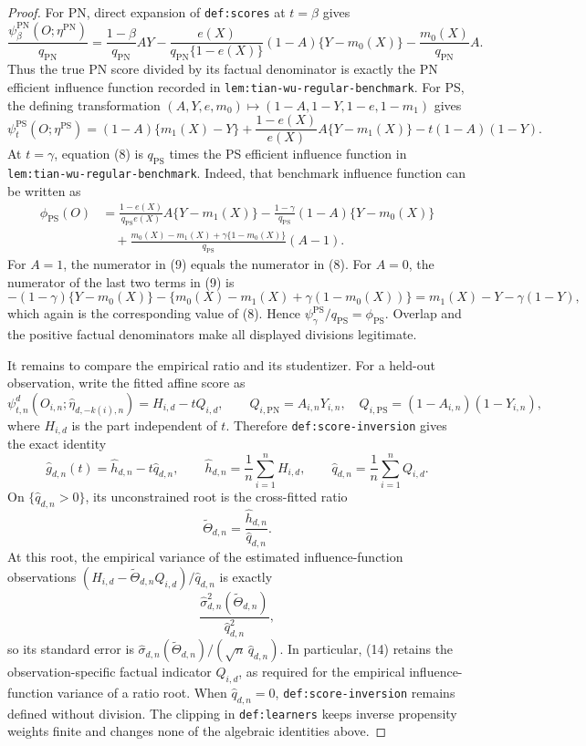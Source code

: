 \documentclass{article}
\begin{document}
\begin{proof}
For PN, direct expansion of \texttt{def:scores} at \(t=\beta\) gives
\[
\frac{\psi_{\beta}^{\mathrm{PN}}(O;\eta^{\mathrm{PN}})}{q_{\mathrm{PN}}}=\frac{1-\beta}{q_{\mathrm{PN}}}AY-\frac{e(X)}{q_{\mathrm{PN}}\{1-e(X)\}}(1-A)\{Y-m_0(X)\}-\frac{m_0(X)}{q_{\mathrm{PN}}}A.
\tag{7}
\]
Thus the true PN score divided by its factual denominator is exactly the PN efficient influence function recorded in \texttt{lem:tian-wu-regular-benchmark}. For PS, the defining transformation \((A,Y,e,m_0)\mapsto(1-A,1-Y,1-e,1-m_1)\) gives
\[
\psi_t^{\mathrm{PS}}(O;\eta^{\mathrm{PS}})=(1-A)\{m_1(X)-Y\}+\frac{1-e(X)}{e(X)}A\{Y-m_1(X)\}-t(1-A)(1-Y).
\tag{8}
\]
At \(t=\gamma\), equation (8) is \(q_{\mathrm{PS}}\) times the PS efficient influence function in \texttt{lem:tian-wu-regular-benchmark}. Indeed, that benchmark influence function can be written as
\[
\begin{aligned}
\phi_{\mathrm{PS}}(O)
&=\frac{1-e(X)}{q_{\mathrm{PS}}e(X)}A\{Y-m_1(X)\}-\frac{1-\gamma}{q_{\mathrm{PS}}}(1-A)\{Y-m_0(X)\}\\
&\quad+\frac{m_0(X)-m_1(X)+\gamma\{1-m_0(X)\}}{q_{\mathrm{PS}}}(A-1).
\end{aligned}
\tag{9}
\]
For \(A=1\), the numerator in (9) equals the numerator in (8). For \(A=0\), the numerator of the last two terms in (9) is
\[
-(1-\gamma)\{Y-m_0(X)\}-\{m_0(X)-m_1(X)+\gamma(1-m_0(X))\}=m_1(X)-Y-\gamma(1-Y),
\tag{10}
\]
which again is the corresponding value of (8). Hence \(\psi_{\gamma}^{\mathrm{PS}}/q_{\mathrm{PS}}=\phi_{\mathrm{PS}}\). Overlap and the positive factual denominators make all displayed divisions legitimate.

It remains to compare the empirical ratio and its studentizer. For a held-out observation, write the fitted affine score as
\[
\psi_{t,n}^d(O_{i,n};\widehat\eta_{d,-k(i),n})=H_{i,d}-tQ_{i,d},
\qquad Q_{i,\mathrm{PN}}=A_{i,n}Y_{i,n},\quad Q_{i,\mathrm{PS}}=(1-A_{i,n})(1-Y_{i,n}),
\tag{11}
\]
where \(H_{i,d}\) is the part independent of \(t\). Therefore \texttt{def:score-inversion} gives the exact identity
\[
\widehat g_{d,n}(t)=\widehat h_{d,n}-t\widehat q_{d,n},\qquad \widehat h_{d,n}=\frac1n\sum_{i=1}^nH_{i,d},\qquad \widehat q_{d,n}=\frac1n\sum_{i=1}^nQ_{i,d}.
\tag{12}
\]
On \(\{\widehat q_{d,n}>0\}\), its unconstrained root is the cross-fitted ratio
\[
\widetilde\Theta_{d,n}=\frac{\widehat h_{d,n}}{\widehat q_{d,n}}.
\tag{13}
\]
At this root, the empirical variance of the estimated influence-function observations \((H_{i,d}-\widetilde\Theta_{d,n}Q_{i,d})/\widehat q_{d,n}\) is exactly
\[
\frac{\widehat\sigma_{d,n}^2(\widetilde\Theta_{d,n})}{\widehat q_{d,n}^2},
\tag{14}
\]
so its standard error is \(\widehat\sigma_{d,n}(\widetilde\Theta_{d,n})/(\sqrt n\,\widehat q_{d,n})\). In particular, (14) retains the observation-specific factual indicator \(Q_{i,d}\), as required for the empirical influence-function variance of a ratio root. When \(\widehat q_{d,n}=0\), \texttt{def:score-inversion} remains defined without division. The clipping in \texttt{def:learners} keeps inverse propensity weights finite and changes none of the algebraic identities above.


\end{proof}
\end{document}
